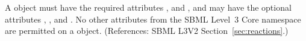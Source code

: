 A \Reaction object must have the required attributes ,
 and , and may have the optional attributes
, ,  and .  No
other attributes from the SBML Level~3 Core namespace are permitted on a
\Reaction object.  (References: SBML L3V2 Section~\ref{sec:reactions}.)
